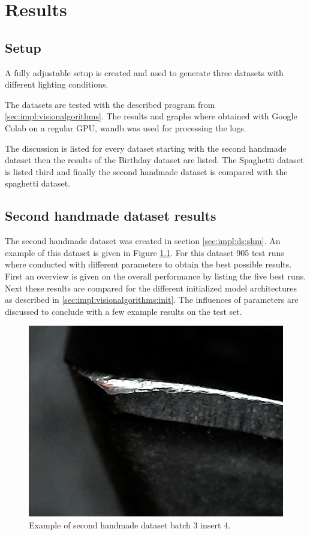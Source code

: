 \chapter{Results}
\label{chap:results}

\section{Setup}
A fully adjustable setup is created and used to generate three datasets with different lighting conditions.

The datasets are tested with the described program from \ref{sec:impl:visionalgorithms}. The results and graphs where obtained with Google Colab on a regular GPU, wandb was used for processing the logs.

The discussion is listed for every dataset starting with the second handmade dataset then the results of the Birthday dataset are listed. The Spaghetti dataset is listed third and finally the second handmade dataset is compared with the spaghetti dataset.

\section{Second handmade dataset results}
The second handmade dataset was created in section \ref{sec:impl:ds:shm}. An example of this dataset is given in Figure \ref{fig:res:shm:example}. For this dataset 905 test runs where conducted with different parameters to obtain the best possible results. First an overview is given on the overall performance by listing the five best runs. Next these results are compared for the different initialized model architectures as described in \ref{sec:impl:visionalgorithms:init}. The influences of parameters are discussed to conclude with a few example results on the test set.

\begin{figure}[hbtp]
\centering
\includegraphics[width=.3\textwidth]{fig/Vision/Dataset/handmade_datasets/Second_handmade_dataset/b_003_p_004_s.jpg}
\caption{Example of second handmade dataset batch 3 insert 4.}
\label{fig:res:shm:example}
\end{figure}

